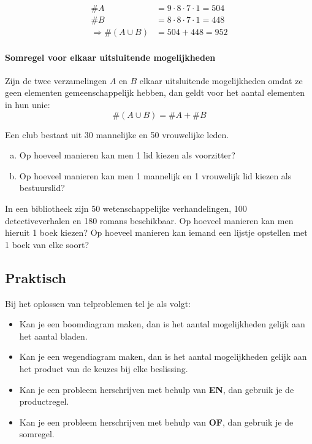 \documentclass[12pt,a4paper,twoside]{article}
\begin{document}
\begin{align*}
\#A &= 9 \cdot 8 \cdot 7 \cdot 1 = 504\\
\#B &= 8 \cdot 8 \cdot 7 \cdot 1 = 448\\
\Rightarrow \#(A \cup B) &= 504 + 448 = 952
\end{align*}

\paragraph*{Somregel voor elkaar uitsluitende mogelijkheden}
\begin{mdframed}
Zijn de twee verzamelingen $A$ en $B$ elkaar uitsluitende mogelijkheden omdat ze geen elementen gemeenschappelijk hebben, dan geldt voor het aantal elementen in hun unie:
\[\#(A\cup B) = \#A + \#B\]
\end{mdframed}

\begin{oefening}
Een club bestaat uit 30 mannelijke en 50 vrouwelijke leden.
\begin{enumerate}[(a)]
  \item Op hoeveel manieren kan men 1 lid kiezen als voorzitter?
  \item Op hoeveel manieren kan men 1 mannelijk en 1 vrouwelijk lid kiezen als bestuurslid?
\end{enumerate}
\end{oefening}

\begin{oefening}
In een bibliotheek zijn 50 wetenschappelijke verhandelingen, 100 detectiveverhalen en 180 romans beschikbaar. Op hoeveel manieren kan men hieruit 1 boek kiezen? Op hoeveel manieren kan iemand een lijstje opstellen met 1 boek van elke soort?
\end{oefening}

\subsection{Praktisch}

\begin{mdframed}
Bij het oplossen van telproblemen tel je als volgt:
\begin{itemize}
  \item Kan je een boomdiagram maken, dan is het aantal mogelijkheden gelijk aan het aantal bladen.
  \item Kan je een wegendiagram maken, dan is het aantal mogelijkheden gelijk aan het product van de keuzes bij elke beslissing.
  \item Kan je een probleem herschrijven met behulp van {\bf EN}, dan gebruik je de productregel.
  \item Kan je een probleem herschrijven met behulp van {\bf OF}, dan gebruik je de somregel.
\end{itemize}
\end{mdframed}
\end{document}
